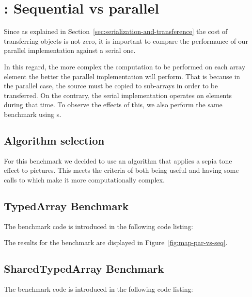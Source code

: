 \section{: Sequential vs parallel}

Since as explained in Section~\ref{sec:serialization-and-transference} the cost of transferring objects is not zero, it is important to compare the performance of our parallel implementation against a serial one.

In this regard, the more complex the computation to be performed on each array element the better the parallel implementation will perform. That is because in the parallel case, the source \ttarray{} must be copied to sub-arrays in order to be transferred. On the contrary, the serial implementation operates on elements during that time. To observe the effects of this, we also perform the same benchmark using \tstarray{}s.

\subsection{Algorithm selection}
For this benchmark we decided to use an algorithm that applies a sepia tone effect to pictures. This meets the criteria of both being useful and having some calls to  which make it more computationally complex.

\subsection{TypedArray Benchmark}
The benchmark code is introduced in the following code listing:


The results for the benchmark are displayed in Figure~\ref{fig:map-par-vs-seq}.

\subsection{SharedTypedArray Benchmark}
The benchmark code is introduced in the following code listing:

